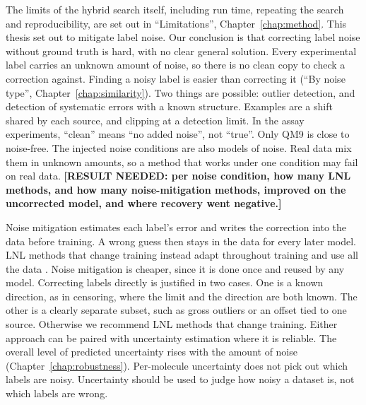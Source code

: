 The limits of the hybrid search itself, including run time, repeating the search and reproducibility, are set out in ``Limitations'', Chapter~\ref{chap:method}. This thesis set out to mitigate label noise. Our conclusion is that correcting label noise without ground truth is hard, with no clear general solution. Every experimental label carries an unknown amount of noise, so there is no clean copy to check a correction against. Finding a noisy label is easier than correcting it (``By noise type'', Chapter~\ref{chap:similarity}). Two things are possible: outlier detection, and detection of systematic errors with a known structure. Examples are a shift shared by each source, and clipping at a detection limit. In the assay experiments, ``clean'' means ``no added noise'', not ``true''. Only QM9 is close to noise-free. The injected noise conditions are also models of noise. Real data mix them in unknown amounts, so a method that works under one condition may fail on real data. \textbf{[RESULT NEEDED: per noise condition, how many LNL methods, and how many noise-mitigation methods, improved on the uncorrected model, and where recovery went negative.]}

Noise mitigation estimates each label's error and writes the correction into the data before training. A wrong guess then stays in the data for every later model. LNL methods that change training instead adapt throughout training and use all the data \citep{Song2022}. Noise mitigation is cheaper, since it is done once and reused by any model. Correcting labels directly is justified in two cases. One is a known direction, as in censoring, where the limit and the direction are both known. The other is a clearly separate subset, such as gross outliers or an offset tied to one source. Otherwise we recommend LNL methods that change training. Either approach can be paired with uncertainty estimation where it is reliable. The overall level of predicted uncertainty rises with the amount of noise (Chapter~\ref{chap:robustness}). Per-molecule uncertainty does not pick out which labels are noisy. Uncertainty should be used to judge how noisy a dataset is, not which labels are wrong.

